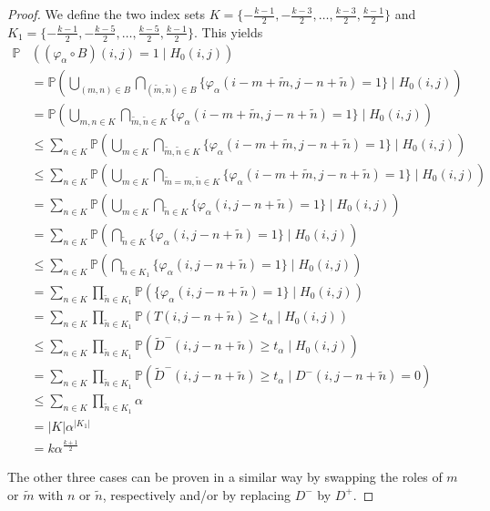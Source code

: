 \documentclass[a4paper,12pt]{article}
\newcommand{\abs}[1]{\lvert#1\rvert}
\theoremstyle{plain}
\theoremstyle{definition}
\theoremstyle{remark}
\begin{document}
\begin{proof}
	We define the two index sets $K = \{ -\frac{k - 1}{2}, -\frac{k - 3}{2}, \dots, \frac{k - 3}{2}, \frac{k - 1}{2} \}$ and $K_1 = \{ -\frac{k - 1}{2}, -\frac{k - 5}{2}, \dots, \frac{k - 5}{2}, \frac{k - 1}{2} \}$. This yields
	\begin{align*}
		\mathbb{P}&( (\varphi_\alpha \circ B)(i, j) = 1 \mid H_0(i, j) ) \\
		&= \mathbb{P}\left( \bigcup_{(m, n) \in B} \bigcap_{(\tilde{m}, \tilde{n}) \in B} \{ \varphi_\alpha(i - m + \tilde{m}, j - n + \tilde{n}) = 1 \} \mid H_0(i, j) \right) \\
		&= \mathbb{P}\left( \bigcup_{m, n \in K} \bigcap_{\tilde{m}, \tilde{n} \in K} \{ \varphi_\alpha(i - m + \tilde{m}, j - n + \tilde{n}) = 1 \} \mid H_0(i, j) \right) \\
		&\leq \sum_{n \in K} \mathbb{P}\left( \bigcup_{m \in K} \bigcap_{\tilde{m}, \tilde{n} \in K} \{ \varphi_\alpha(i - m + \tilde{m}, j - n + \tilde{n}) = 1 \} \mid H_0(i, j) \right) \\
		&\leq \sum_{n \in K} \mathbb{P}\left( \bigcup_{m \in K} \bigcap_{\tilde{m} = m, \tilde{n} \in K} \{ \varphi_\alpha(i - m + \tilde{m}, j - n + \tilde{n}) = 1 \} \mid H_0(i, j) \right) \\
		&= \sum_{n \in K} \mathbb{P}\left( \bigcup_{m \in K} \bigcap_{\tilde{n} \in K} \{ \varphi_\alpha(i, j - n + \tilde{n}) = 1 \} \mid H_0(i, j) \right) \\
		&= \sum_{n \in K} \mathbb{P}\left( \bigcap_{\tilde{n} \in K} \{ \varphi_\alpha(i, j - n + \tilde{n}) = 1 \} \mid H_0(i, j) \right) \\
		&\leq \sum_{n \in K} \mathbb{P}\left( \bigcap_{\tilde{n} \in K_1} \{ \varphi_\alpha(i, j - n + \tilde{n}) = 1 \} \mid H_0(i, j) \right) \\
		&= \sum_{n \in K} \prod_{\tilde{n} \in K_1} \mathbb{P}( \{ \varphi_\alpha(i, j - n + \tilde{n}) = 1 \} \mid H_0(i, j) ) \\
		&= \sum_{n \in K} \prod_{\tilde{n} \in K_1} \mathbb{P}( T(i, j - n + \tilde{n}) \geq t_\alpha \mid H_0(i, j) ) \\
		&\leq \sum_{n \in K} \prod_{\tilde{n} \in K_1} \mathbb{P}( \tilde{D}^-(i, j - n + \tilde{n}) \geq t_\alpha \mid H_0(i, j) ) \\
		&= \sum_{n \in K} \prod_{\tilde{n} \in K_1} \mathbb{P}( \tilde{D}^-(i, j - n + \tilde{n}) \geq t_\alpha \mid D^-(i, j - n + \tilde{n}) = 0 ) \\
		&\leq \sum_{n \in K} \prod_{\tilde{n} \in K_1} \alpha \\
		&= \abs{K} \alpha^{\abs{K_1}} \\
		&= k \alpha^{\frac{k+1}{2}}
	\end{align*}
	
	The other three cases can be proven in a similar way by swapping the roles of $m$ or $\tilde{m}$ with $n$ or $\tilde{n}$, respectively and/or by replacing $D^-$ by $D^+$.
\end{proof}
\end{document}

